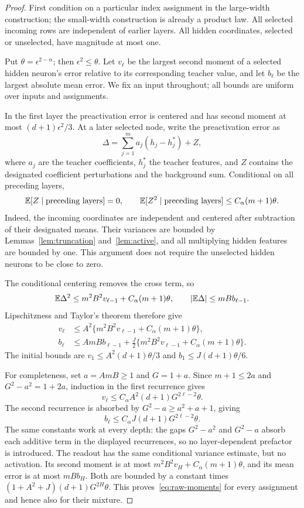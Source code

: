 \begin{proof}
First condition on a particular index assignment in the large-width construction; the small-width construction is already a product law. All selected incoming rows are independent of earlier layers. All hidden coordinates, selected or unselected, have magnitude at most one.

Put $\theta=\epsilon^{2-\alpha}$; then $\epsilon^2\le\theta$. Let $v_\ell$ be the largest second moment of a selected hidden neuron's error relative to its corresponding teacher value, and let $b_\ell$ be the largest absolute mean error. We fix an input throughout; all bounds are uniform over inputs and assignments.

In the first layer the preactivation error is centered and has second moment at most $(d+1)\epsilon^2/3$. At a later selected node, write the preactivation error as
\[
 \Delta=\sum_{j=1}^m a_j(h_j-h_j^*)+Z,
\]
where $a_j$ are the teacher coefficients, $h_j^*$ the teacher features, and $Z$ contains the designated coefficient perturbations and the background sum. Conditional on all preceding layers,
\begin{equation}
 \mathbb E[Z\mid\text{preceding layers}]=0,\qquad
 \mathbb E[Z^2\mid\text{preceding layers}]
 \le C_\alpha(m+1)\theta.
 \label{eq:centered-background}
\end{equation}
Indeed, the incoming coordinates are independent and centered after subtraction of their designated means. Their variances are bounded by Lemmas~\ref{lem:truncation} and~\ref{lem:active}, and all multiplying hidden features are bounded by one. This argument does not require the unselected hidden neurons to be close to zero.

The conditional centering removes the cross term, so
\[
 \mathbb E\Delta^2\le m^2B^2v_{\ell-1}+C_\alpha(m+1)\theta,
 \qquad |\mathbb E\Delta|\le mB b_{\ell-1}.
\]
Lipschitzness and Taylor's theorem therefore give
\begin{align}
 v_\ell&\le A^2\{m^2B^2v_{\ell-1}+C_\alpha(m+1)\theta\},\\
 b_\ell&\le AmB b_{\ell-1}
       +\frac J2\{m^2B^2v_{\ell-1}+C_\alpha(m+1)\theta\}.
 \label{eq:moment-recurrence}
\end{align}
The initial bounds are $v_1\le A^2(d+1)\theta/3$ and $b_1\le J(d+1)\theta/6$.

For completeness, set $a=AmB\ge1$ and $G=1+a$. Since $m+1\le2a$ and $G^2-a^2=1+2a$, induction in the first recurrence gives
\[
 v_\ell\le C_\alpha A^2(d+1)G^{2\ell-2}\theta.
\]
The second recurrence is absorbed by $G^2-a\ge a^2+a+1$, giving
\[
 b_\ell\le C_\alpha J(d+1)G^{2\ell-2}\theta.
\]
The same constants work at every depth: the gaps $G^2-a^2$ and $G^2-a$ absorb each additive term in the displayed recurrences, so no layer-dependent prefactor is introduced. The readout has the same conditional variance estimate, but no activation. Its second moment is at most $m^2B^2v_H+C_\alpha(m+1)\theta$, and its mean error is at most $mB b_H$. Both are bounded by a constant times $(1+A^2+J)(d+1)G^{2H}\theta$. This proves~\eqref{eq:raw-moments} for every assignment and hence also for their mixture.
\end{proof}

